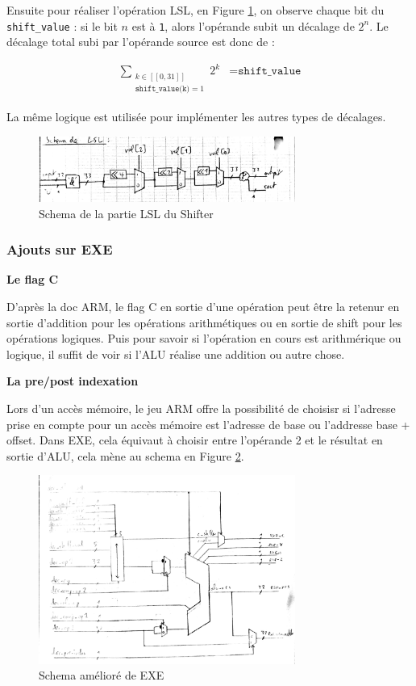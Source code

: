 \documentclass{article}
\begin{document}
Ensuite pour réaliser l'opération LSL, en Figure \ref{shifter_lsl},
on observe chaque bit du \texttt{shift\_value} :
si le bit $n$ est à \texttt{1}, alors l'opérande subit un décalage de $2^n$.
Le décalage total subi par l'opérande source est donc de :

\begin{eqnarray*}
  \sum_{\substack{k \in [[0, 31]] \\ \texttt{shift\_value(k)} = 1}} 2^k &= \texttt{shift\_value}
\end{eqnarray*}

La même logique est utilisée pour implémenter les autres types de décalages.

\begin{figure}[H]
\includegraphics[width=0.75\textwidth]{pics/shifter_lsl.png}
\centering
\caption{Schema de la partie LSL du Shifter}
\label{shifter_lsl}
\end{figure}



\subsubsection{Ajouts sur EXE}

\textbf{Le flag C}

D'après la doc ARM, le flag C en sortie d'une opération peut être la retenur en sortie d'addition
pour les opérations arithmétiques ou en sortie de shift pour les opérations logiques.
Puis pour savoir si l'opération en cours est arithmérique ou logique, il suffit de voir si
l'ALU réalise une addition ou autre chose.

\textbf{La pre/post indexation}

Lors d'un accès mémoire, le jeu ARM offre la possibilité de choisisr si l'adresse prise en compte
pour un accès mémoire est l'adresse de base ou l'addresse base + offset.
Dans EXE, cela équivaut à choisir entre l'opérande 2 et le résultat en sortie d'ALU,
cela mène au schema en Figure \ref{exe2}.

\begin{figure}[H]
\includegraphics[width=0.75\textwidth]{pics/exe2.png}
\centering
\caption{Schema amélioré de EXE}
\label{exe2}
\end{figure}
\end{document}
